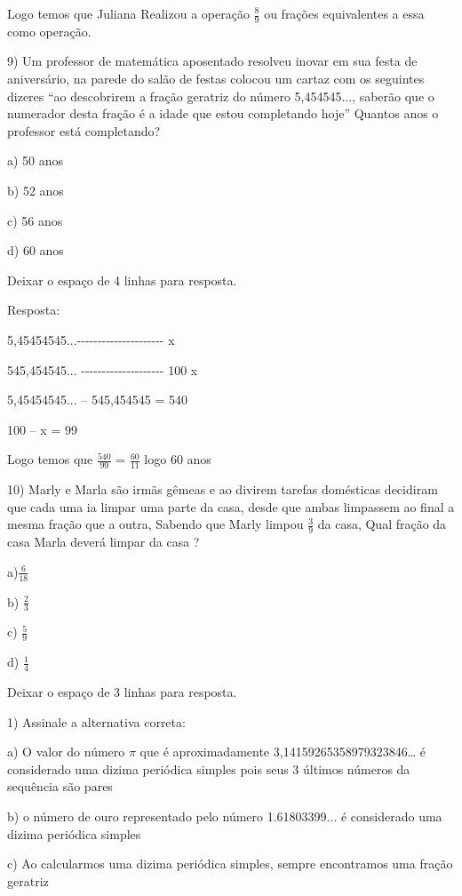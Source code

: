 Logo temos que Juliana Realizou a operação \(\frac{8}{9}\) ou frações
equivalentes a essa como operação.

9) Um professor de matemática aposentado resolveu inovar em sua festa de
aniversário, na parede do salão de festas colocou um cartaz com os
seguintes dizeres ``ao descobrirem a fração geratriz do número
5,454545..., saberão que o numerador desta fração é a idade que estou
completando hoje'' Quantos anos o professor está completando?

a) 50 anos

b) 52 anos

c) 56 anos

d) 60 anos

Deixar o espaço de 4 linhas para resposta.

Resposta:

5,45454545...-\/-\/-\/-\/-\/-\/-\/-\/-\/-\/-\/-\/-\/-\/-\/-\/-\/-\/-\/-\/-
x

545,454545... -\/-\/-\/-\/-\/-\/-\/-\/-\/-\/-\/-\/-\/-\/-\/-\/-\/-\/-\/-
100 x

5,45454545... -- 545,454545 = 540

100 -- x = 99

Logo temos que \(\frac{540}{99}\) = \(\frac{60}{11}\) logo 60 anos

10) Marly e Marla são irmãs gêmeas e ao divirem tarefas domésticas
decidiram que cada uma ia limpar uma parte da casa, desde que ambas
limpassem ao final a mesma fração que a outra, Sabendo que Marly limpou
\(\frac{3}{9}\) da casa, Qual fração da casa Marla deverá limpar da casa
?

a)\(\frac{6}{18}\)

b) \(\frac{2}{3}\)

c) \(\frac{5}{9}\)

d) \(\frac{1}{4}\)

Deixar o espaço de 3 linhas para resposta.


1) Assinale a alternativa correta:

a) O valor do número \(\pi\) que é aproximadamente
3,14159265358979323846\ldots{} é considerado uma dizima periódica
simples pois seus 3 últimos números da sequência são pares

b) o número de ouro representado pelo número 1.61803399... é considerado
uma dizima periódica simples

c) Ao calcularmos uma dizima periódica simples, sempre encontramos uma
fração geratriz

